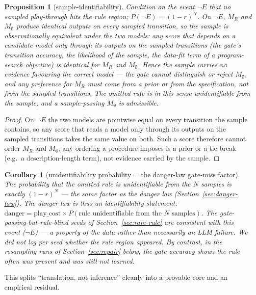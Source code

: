 \documentclass[11pt]{article}
\newtheorem{proposition}{Proposition}
\newtheorem{corollary}{Corollary}
\theoremstyle{remark}
\begin{document}
\begin{proposition}[sample-identifiability]
\label{prop:identifiability}
Condition on the event $\neg E$ that no sampled play-through hits the rule region; $P(\neg E) = (1-r)^N$. On $\neg E$, $M_R$ and $M_\emptyset$ produce identical outputs on every sampled transition, so the sample is observationally equivalent under the two models: any score that depends on a candidate model only through its outputs on the sampled transitions (the gate's transition accuracy, the likelihood of the sample, the data-fit term of a program-search objective) is identical for $M_R$ and $M_\emptyset$. Hence the sample carries no evidence favouring the correct model --- the gate cannot distinguish or reject $M_\emptyset$, and any preference for $M_R$ must come from a prior or from the specification, not from the sampled transitions. The omitted rule is in this sense unidentifiable from the sample, and a sample-passing $M_\emptyset$ is admissible.
\end{proposition}

\begin{proof}
On $\neg E$ the two models are pointwise equal on every transition the sample contains, so any score that reads a model only through its outputs on the sampled transitions takes the same value on both. Such a score therefore cannot order $M_R$ and $M_\emptyset$; any ordering a procedure imposes is a prior or a tie-break (e.g.\ a description-length term), not evidence carried by the sample.
\end{proof}

\begin{corollary}[unidentifiability probability = the danger-law gate-miss factor]
The probability that the omitted rule is unidentifiable from the $N$ samples is exactly $(1-r)^N$ --- the same factor as the danger law (Section~\ref{sec:danger-law}). The danger law is thus an identifiability statement: $\mathrm{danger} = \mathrm{play\_cost} \times P(\text{rule unidentifiable from the } N \text{ samples})$. The gate-passing-but-rule-blind seeds of Section~\ref{sec:rare-rule} are \emph{consistent with} this event ($\neg E$) --- a property of the data rather than necessarily an LLM failure. We did not log per seed whether the rule region appeared. By contrast, in the resampling runs of Section~\ref{sec:repair} below, the gate accuracy shows the rule often \emph{was} present and was still not learned.
\end{corollary}

This splits ``translation, not inference'' cleanly into a provable core and an empirical residual.
\end{document}
